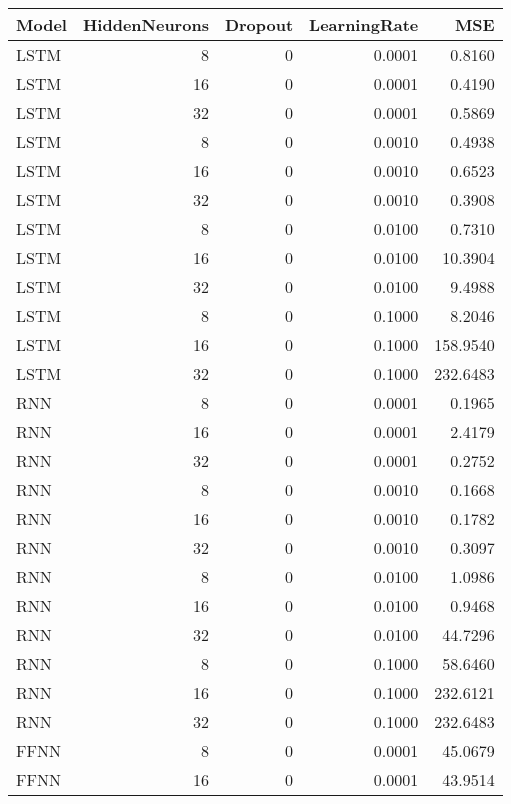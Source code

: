 \begin{table}[h!]
\centering
 \begin{adjustbox}{max width=\textwidth}
\begin{tabular}{lrrrr}
  \hline
Model & HiddenNeurons & Dropout & LearningRate & MSE \\ 
  \hline
LSTM &     8 &     0 & 0.0001 & 0.8160 \\ 
  LSTM &    16 &     0 & 0.0001 & 0.4190 \\ 
  LSTM &    32 &     0 & 0.0001 & 0.5869 \\ 
  LSTM &     8 &     0 & 0.0010 & 0.4938 \\ 
  LSTM &    16 &     0 & 0.0010 & 0.6523 \\ 
  LSTM &    32 &     0 & 0.0010 & 0.3908 \\ 
  LSTM &     8 &     0 & 0.0100 & 0.7310 \\ 
  LSTM &    16 &     0 & 0.0100 & 10.3904 \\ 
  LSTM &    32 &     0 & 0.0100 & 9.4988 \\ 
  LSTM &     8 &     0 & 0.1000 & 8.2046 \\ 
  LSTM &    16 &     0 & 0.1000 & 158.9540 \\ 
  LSTM &    32 &     0 & 0.1000 & 232.6483 \\ 
  RNN &     8 &     0 & 0.0001 & 0.1965 \\ 
  RNN &    16 &     0 & 0.0001 & 2.4179 \\ 
  RNN &    32 &     0 & 0.0001 & 0.2752 \\ 
  RNN &     8 &     0 & 0.0010 & 0.1668 \\ 
  RNN &    16 &     0 & 0.0010 & 0.1782 \\ 
  RNN &    32 &     0 & 0.0010 & 0.3097 \\ 
  RNN &     8 &     0 & 0.0100 & 1.0986 \\ 
  RNN &    16 &     0 & 0.0100 & 0.9468 \\ 
  RNN &    32 &     0 & 0.0100 & 44.7296 \\ 
  RNN &     8 &     0 & 0.1000 & 58.6460 \\ 
  RNN &    16 &     0 & 0.1000 & 232.6121 \\ 
  RNN &    32 &     0 & 0.1000 & 232.6483 \\ 
  FFNN &     8 &     0 & 0.0001 & 45.0679 \\ 
  FFNN &    16 &     0 & 0.0001 & 43.9514 \\ 

\end{tabular}
\end{adjustbox}
\end{table}

